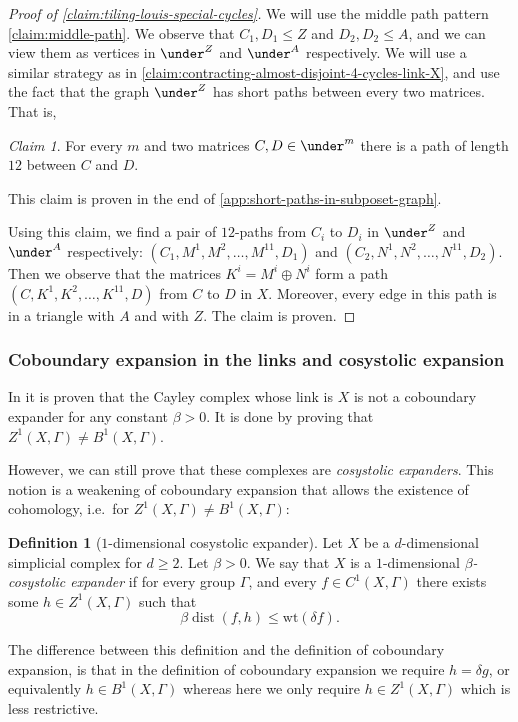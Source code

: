 \documentclass[10pt,a4paper]{article}
\newcommand{\prettyref}[1]{\cref{#1}}
\theoremstyle{definition}
\newtheorem{definition}[theorem]{Definition}
\theoremstyle{remark}
\newtheorem{claim}[theorem]{Claim}
\def\wt{{\mathrm{wt}}}
\DeclareMathOperator{\dist}{dist}
\renewcommand{\leq}{\leqslant}
\renewcommand{\geq}{\geqslant}
\numberwithin{equation}{section}
\let\pref=\prettyref
\newcommand{\coboundary}{{\delta}}
\begin{document}
\begin{proof}[Proof of \pref{claim:tiling-louis-special-cycles}]
    We will use the middle path pattern \pref{claim:middle-path}. We observe that \(C_1,D_1 \leq Z\) and \(D_2,D_2 \leq A\), and we can view them as vertices in \(\under^{Z}\) and \(\under^{A}\) respectively. We will use a similar strategy as in \pref{claim:contracting-almost-disjoint-4-cycles-link-X}, and use the fact that the graph \(\under^{Z}\) has short paths between every two matrices. That is,
    \begin{claim}\label{claim:short-paths-in-under-graph}
        For every \(m\) and two matrices \(C,D \in \under^m\) there is a path of length \(12\) between \(C\) and \(D\).
    \end{claim}
    This claim is proven in the end of \pref{app:short-paths-in-subposet-graph}. 
    
    Using this claim, we find a pair of \(12\)-paths from \(C_i\) to \(D_i\) in \(\under^{Z}\) and \(\under^{A}\) respectively: \((C_1,M^1,M^2,\dots,M^{11},D_1)\) and \((C_2,N^1,N^2,\dots,N^{11},D_2)\). Then we observe that the matrices \(K^i=M^i \oplus N^i\) form a path \((C,K^1,K^2,\dots,K^{11},D)\) from \(C\) to \(D\) in \(X\). Moreover, every edge in this path is in a triangle with \(A\) and with \(Z\). The claim is proven.
\end{proof}

\subsubsection{Coboundary expansion in the links and cosystolic expansion}
    In \cite{Golowich2023} it is proven that the Cayley complex whose link is \(X\) is not a coboundary expander for any constant \(\beta > 0\). It is done by proving that \(Z^1(X,\Gamma) \ne B^1(X,\Gamma)\).
    
    However, we can still prove that these complexes are \emph{cosystolic expanders}. This notion is a weakening of coboundary expansion that allows the existence of cohomology, i.e.\ for \(Z^1(X,\Gamma) \ne B^1(X,\Gamma)\):
    \begin{definition}[$1$-dimensional cosystolic expander] \label{def:def-of-cosystolic-exp}
        Let \(X\) be a \(d\)-dimensional simplicial complex for \(d \geq 2\). Let \(\beta >0\). We say that \(X\) is a $1$-dimensional \emph{\(\beta\)-cosystolic expander} if for every group \(\Gamma\), and every \(f \in C^1(X,\Gamma)\) there exists some \(h \in Z^1(X,\Gamma)\) such that
    \begin{equation} \label{eq:def-of-cosyst-exp}
        \beta \dist(f,h) \leq \wt(\coboundary f).
    \end{equation}
    \end{definition}
    The difference between this definition and the definition of coboundary expansion, is that in the definition of coboundary expansion we require \(h=\coboundary g\), or equivalently \(h \in B^1(X,\Gamma)\) whereas here we only require \(h \in Z^1(X,\Gamma)\) which is less restrictive.
\end{document}
